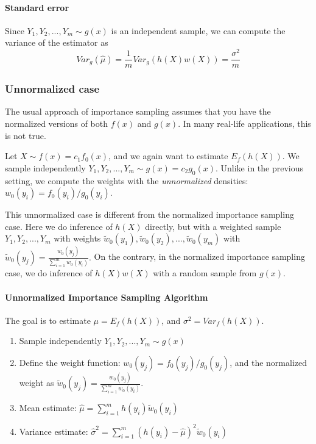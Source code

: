 \documentclass[useAMS,usenatbib]{biom}
\begin{document}
\paragraph{Standard error}
Since $Y_1,Y_2,...,Y_m \sim g(x)$ is an independent sample, we can
compute the variance of the estimator as
\begin{equation}
Var_g(\hat{\mu}) = \frac{1}{m} Var_g(h(X)w(X)) = \frac{\sigma^2}{m}
\end{equation}

\subsubsection{Unnormalized case}
The usual approach of importance sampling assumes that you have the
normalized versions of both $f(x)$ and $g(x)$. In many real-life
applications, this is not true.

Let $X \sim f(x) = c_1 f_0(x)$, and we again want to estimate
$E_f(h(X))$. We sample independently $Y_1,Y_2,...,Y_m \sim g(x) = c_2
g_0(x)$.
Unlike in the previous setting, we compute the weights with the
\textit{unnormalized} densities: $w_0(y_i) = f_0(y_i) / g_0(y_i)$.

This unnormalized case is different from the normalized importance
sampling case. Here we do inference of $h(X)$ directly, but
with a weighted sample $Y_1,Y_2,...,Y_m$ with weights
$\tilde{w}_0(y_1),\tilde{w}_0(y_2),...,\tilde{w}_0(y_m)$ with
$\tilde{w}_0(y_j) = \frac{w_0(y_j)}{\sum_{i=1}^m w_0(y_i)}.$ On the
contrary, in the normalized importance sampling case, we do inference
of $h(X)w(X)$ with a random sample from $g(x)$.

\paragraph{Unnormalized Importance Sampling Algorithm} The goal is to estimate
$\mu = E_f(h(X))$, and $\sigma^2 = Var_f(h(X))$.
\begin{enumerate}
\item{Sample independently $Y_1,Y_2,...,Y_m \sim g(x)$}
\item{Define the weight function: $w_0(y_j) = f_0(y_j)/g_0(y_j)$, and
    the normalized weight as $\tilde{w}_0(y_j) =
    \frac{w_0(y_j)}{\sum_{i=1}^m w_0(y_i)}.$}
\item{Mean estimate: $\hat{\mu} = \sum_{i=1}^m
    h(y_i)\tilde{w}_0(y_i)$}
\item{Variance estimate: $\hat{\sigma}^2 = \sum_{i=1}^m
    (h(y_i) - \hat{\mu})^2 \tilde{w}_0(y_i)$}
\end{enumerate}
\end{document}
